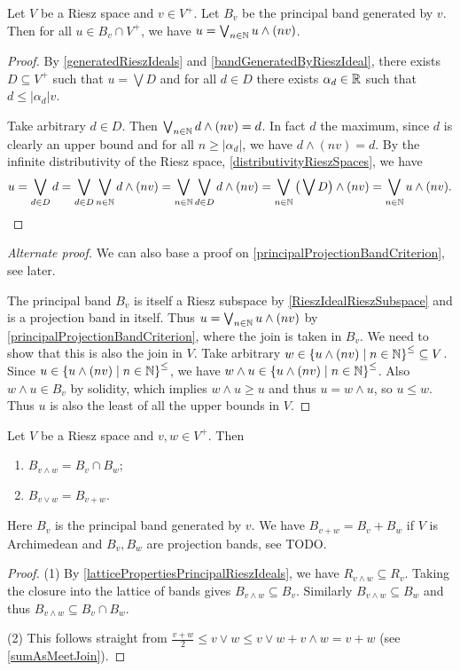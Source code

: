 \begin{lemma} \label{approximationInPrincipalBand}
Let $V$ be a Riesz space and $v\in V^+$. Let $B_v$ be the principal band generated by $v$. Then for all $u \in B_v \cap V^+$, we have $u = \bigvee_{n\in \mathbb{N}}u\wedge (nv)$.
\end{lemma}
\begin{proof}
By \ref{generatedRieszIdeals} and \ref{bandGeneratedByRieszIdeal}, there exists $D\subseteq V^+$ such that $u = \bigvee D$ and for all $d\in D$ there exists $\alpha_d\in \mathbb{R}$ such that $d \leq |\alpha_d| v$.

Take arbitrary $d\in D$. Then $\bigvee_{n\in \mathbb{N}}d\wedge (nv) = d$. In fact $d$ the maximum, since $d$ is clearly an upper bound and for all $n \geq |\alpha_d|$, we have $d\wedge (nv) = d$. By the infinite distributivity of the Riesz space, \ref{distributivityRieszSpaces}, we have
\[ u = \bigvee_{d\in D}d = \bigvee_{d\in D}\bigvee_{n\in \mathbb{N}}d\wedge (nv) = \bigvee_{n\in \mathbb{N}}\bigvee_{d\in D}d\wedge (nv) = \bigvee_{n\in \mathbb{N}}\big(\bigvee D\big)\wedge (nv) = \bigvee_{n\in \mathbb{N}}u\wedge (nv). \]
\end{proof}
\begin{proof}[Alternate proof]
We can also base a proof on \ref{principalProjectionBandCriterion}, see later.

The principal band $B_v$ is itself a Riesz subspace by \ref{RieszIdealRieszSubspace} and is a projection band in itself. Thus $u = \bigvee_{n\in \mathbb{N}}u\wedge (nv)$ by \ref{principalProjectionBandCriterion}, where the join is taken in $B_v$. We need to show that this is also the join in $V$. Take arbitrary $w\in \setbuilder{u\wedge (nv)}{n\in \N}^\leq \subseteq V$. Since $u\in \setbuilder{u\wedge (nv)}{n\in \N}^\leq$, we have $w\wedge u \in \setbuilder{u\wedge (nv)}{n\in \N}^\leq$. Also $w\wedge u \in B_v$ by solidity, which implies $w\wedge u \geq u$ and thus $u = w\wedge u$, so $u \leq w$. Thus $u$ is also the least of all the upper bounds in $V$.
\end{proof}

\begin{proposition} \label{latticePropertiesPrincipalBands}
Let $V$ be a Riesz space and $v,w\in V^+$. Then
\begin{enumerate}
\item $B_{v\wedge w} = B_v \cap B_w$;
\item $B_{v\vee w} = B_{v+w}$.
\end{enumerate}
\end{proposition}
Here $B_v$ is the principal band generated by $v$. We have $B_{v+w} = B_v + B_w$ if $V$ is Archimedean and $B_v, B_w$ are projection bands, see TODO.
\begin{proof}
(1) By \ref{latticePropertiesPrincipalRieszIdeals}, we have $R_{v\wedge w} \subseteq R_v$. Taking the closure into the lattice of bands gives $B_{v\wedge w} \subseteq B_v$. Similarly $B_{v\wedge w} \subseteq B_w$ and thus $B_{v\wedge w} \subseteq B_v \cap B_w$.

(2) This follows straight from $\frac{v+w}{2} \leq v\vee w \leq v\vee w + v\wedge w = v + w$ (see \ref{sumAsMeetJoin}).
\end{proof}



